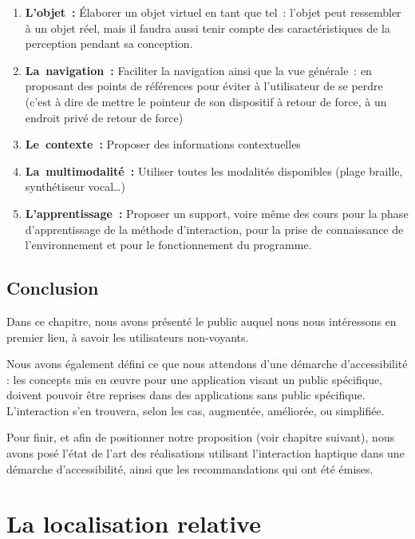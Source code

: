 \documentclass[
]{book}
\providecommand{\tightlist}{%
  \setlength{\itemsep}{0pt}\setlength{\parskip}{0pt}}
\begin{document}
\begin{enumerate}
\def\labelenumi{\arabic{enumi}.}
\tightlist
\item
  \textbf{L'objet~:} Élaborer un objet virtuel en
  tant que tel~: l'objet peut ressembler à un objet réel, mais il faudra
  aussi tenir compte des caractéristiques de la perception pendant sa
  conception.
\item
  \textbf{La~navigation~:} Faciliter la
  navigation ainsi que la vue générale~: en proposant des points de
  références pour éviter à l'utilisateur de se perdre (c'est à dire de mettre
  le pointeur de son dispositif à retour de force, à un endroit privé de
  retour de force)
\item
  \textbf{Le~contexte~:} Proposer des
  informations contextuelles
\item
  \textbf{La~multimodalité~:} Utiliser
  toutes les modalités disponibles (plage braille, synthétiseur
  vocal\ldots)
\item
  \textbf{L'apprentissage~:} Proposer un support,
  voire même des cours pour la phase d'apprentissage de la méthode
  d'interaction, pour la prise de connaissance de l'environnement et pour le
  fonctionnement du programme.
\end{enumerate}

\hypertarget{conclusion-3}{%
\section{Conclusion}\label{conclusion-3}}

Dans ce chapitre, nous avons présenté le public auquel nous nous
intéressons en premier lieu, à savoir les utilisateurs non-voyants.

Nous avons également défini ce que nous attendons d'une démarche
d'accessibilité : les concepts mis en œuvre pour une application visant un
public spécifique, doivent pouvoir être reprises dans des applications sans
public spécifique. L'interaction s'en trouvera, selon les cas, augmentée,
améliorée, ou simplifiée.

Pour finir, et afin de positionner notre proposition (voir chapitre
suivant), nous avons posé l'état de l'art des réalisations utilisant
l'interaction haptique dans une démarche d'accessibilité, ainsi que les
recommandations qui ont été émises.

\hypertarget{la-localisation-relative}{%
\chapter{La localisation relative}\label{la-localisation-relative}}
\end{document}
